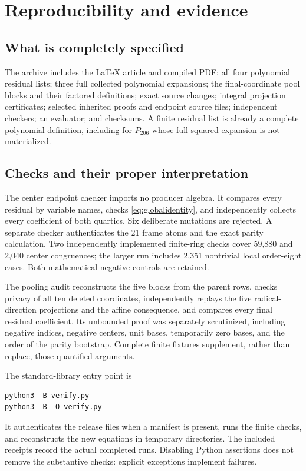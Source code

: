 \documentclass[10pt,letterpaper]{article}
\theoremstyle{definition}\newtheorem{definition}[theorem]{Definition}
\theoremstyle{remark}\newtheorem{remark}[theorem]{Remark}
\begin{document}
\section{Reproducibility and evidence}

\subsection{What is completely specified}

The archive includes the LaTeX article and compiled PDF; all four
polynomial residual lists; three full collected polynomial expansions;
the final-coordinate pool blocks and their factored definitions; exact
source changes; integral projection certificates; selected inherited
proofs and endpoint source files; independent checkers; an evaluator;
and checksums. A finite residual list is already a complete polynomial
definition, including for $P_{206}$ whose full squared expansion is not
materialized.

\subsection{Checks and their proper interpretation}

The center endpoint checker imports no producer algebra. It compares
every residual by variable names, checks \eqref{eq:globalidentity}, and
independently collects every coefficient of both quartics. Six deliberate
mutations are rejected. A separate checker authenticates the 21 frame
atoms and the exact parity calculation. Two independently implemented
finite-ring checks cover 59,880 and 2,040 center congruences; the larger
run includes 2,351 nontrivial local order-eight cases. Both mathematical
negative controls are retained.

The pooling audit reconstructs the five blocks from the parent rows,
checks privacy of all ten deleted coordinates, independently replays
the five radical-direction projections and the affine consequence,
and compares every final residual coefficient. Its unbounded proof was
separately scrutinized, including negative indices, negative centers,
unit bases, temporarily zero bases, and the order of the parity
bootstrap. Complete finite fixtures supplement, rather than replace,
those quantified arguments.

The standard-library entry point is
\begin{verbatim}
python3 -B verify.py
python3 -B -O verify.py
\end{verbatim}
It authenticates the release files when a manifest is present, runs the
finite checks, and reconstructs the new equations in temporary
directories. The included receipts record the actual completed runs.
Disabling Python assertions does not remove the substantive checks:
explicit exceptions implement failures.
\end{document}
